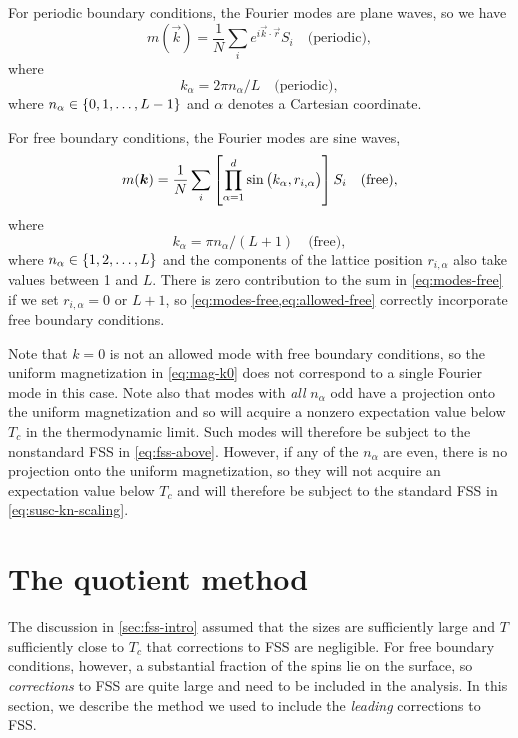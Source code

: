 For periodic boundary conditions, the Fourier modes are plane waves,
so we have
\begin{equation}
  m(\vec{k}) = \frac{1}{N} \sum_i e^{i\vec{k}\cdot\vec{r}} S_i
  \quad\text{(periodic)},
\end{equation}
where
\begin{equation}
  k_{\alpha} = 2\pi n_{\alpha}/L
  \quad\text{(periodic)},
\end{equation}
where $n_{\alpha}\in\cbr{0,1,\dots,L-1}$ and $\alpha$ denotes a Cartesian
coordinate.

For free boundary conditions, the Fourier modes are sine waves,
\begin{equation}
  m(\bm{k}) = \frac{1}{N} \sum_i
  \left[\prod_{\alpha=1}^d \sin\left(k_{\alpha},r_{i,\alpha}\right)\right] S_i
  \quad\text{(free)},
  \label{eq:modes-free}
\end{equation}
where
\begin{equation}
  k_{\alpha} = \pi n_{\alpha}/(L+1)
  \quad\text{(free)},
  \label{eq:allowed-free}
\end{equation}
where $n_{\alpha}\in\cbr{1,2,\dots,L}$ and the components of the lattice
position $r_{i,\alpha}$ also take values between 1 and $L$. There is zero
contribution to the sum in \cref{eq:modes-free} if we set $r_{i,\alpha}=0$ or
$L+1$, so \cref{eq:modes-free,eq:allowed-free} correctly incorporate free
boundary conditions.

Note that $k=0$ is not an allowed mode with free boundary conditions, so the
uniform magnetization in \cref{eq:mag-k0} does not correspond to a single
Fourier mode in this case. Note also that modes with \emph{all} $n_{\alpha}$
odd have a projection onto the uniform magnetization and so will acquire a
nonzero expectation value below $T_c$ in the thermodynamic limit. Such modes
will therefore be subject to the nonstandard FSS in \cref{eq:fss-above}.
However, if any of the $n_{\alpha}$ are even, there is no projection onto the
uniform magnetization, so they will not acquire an expectation value below
$T_c$ and will therefore be subject to the standard FSS in
\cref{eq:susc-kn-scaling}.


\section{The quotient method}
\label{sec:fss-quotient}

The discussion in \cref{sec:fss-intro} assumed that the sizes are
sufficiently large and $T$ sufficiently close to $T_c$ that corrections to FSS
are negligible. For free boundary conditions, however, a substantial fraction
of the spins lie on the surface, so \emph{corrections} to FSS are quite large
and need to be included in the analysis. In this section, we describe the
method we used to include the \emph{leading} corrections to FSS.

